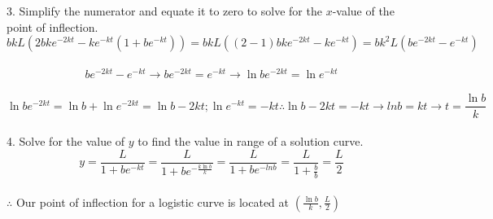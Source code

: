 \documentclass[10pt,letterpaper]{report}
\begin{document}
3. Simplify the numerator and equate it to zero to solve for the $x$-value of the point of inflection. 
$$bkL(2bke^{-2kt}-ke^{-kt}(1+be^{-kt}))=bkL((2-1)bke^{-2kt}-ke^{-kt})=bk^{2}L(be^{-2kt}-e^{-kt})$$ \\

$$be^{-2kt}-e^{-kt}\rightarrow be^{-2kt}=e^{-kt}\rightarrow \ln{be^{-2kt}}=\ln{e^{-kt}}$$ \\
$$\ln{be^{-2kt}}=\ln{b}+\ln{e^{-2kt}}=\ln{b}-2kt; \ln{e^{-kt}}=-kt\therefore \ln{b}-2kt=-kt\rightarrow ln{b}=kt\rightarrow t=\frac{\ln{b}}{k}$$ \\

4. Solve for the value of $y$ to find the value in range of a solution curve. 
$$y=\frac{L}{1+be^{-kt}}=\frac{L}{1+be^{-\frac{k\ln{b}}{k}}}=\frac{L}{1+be^{-ln{b}}}=\frac{L}{1+\frac{b}{b}}=\frac{L}{2}$$ \\

$\therefore$ Our point of inflection for a logistic curve is located at $\left(\frac{\ln{b}}{k}, \frac{L}{2}\right)$
\pagebreak 
\end{document}
